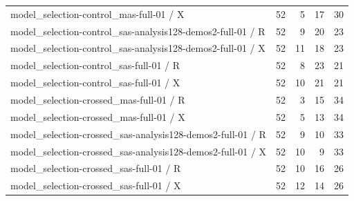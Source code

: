 {\begin{longtable}{p{}rrrr}
model\_selection-control\_mas-full-01 / X & 52 & 5 & 17 & 30 \\
model\_selection-control\_sas-analysis128-demos2-full-01 / R & 52 & 9 & 20 & 23 \\
model\_selection-control\_sas-analysis128-demos2-full-01 / X & 52 & 11 & 18 & 23 \\
model\_selection-control\_sas-full-01 / R & 52 & 8 & 23 & 21 \\
model\_selection-control\_sas-full-01 / X & 52 & 10 & 21 & 21 \\
model\_selection-crossed\_mas-full-01 / R & 52 & 3 & 15 & 34 \\
model\_selection-crossed\_mas-full-01 / X & 52 & 5 & 13 & 34 \\
model\_selection-crossed\_sas-analysis128-demos2-full-01 / R & 52 & 9 & 10 & 33 \\
model\_selection-crossed\_sas-analysis128-demos2-full-01 / X & 52 & 10 & 9 & 33 \\
model\_selection-crossed\_sas-full-01 / R & 52 & 10 & 16 & 26 \\
model\_selection-crossed\_sas-full-01 / X & 52 & 12 & 14 & 26 \\
\end{longtable}}
